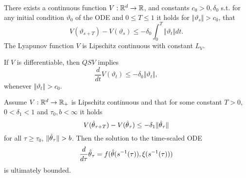 
There exists a continuous function \(V:\mathbb{R}^d\to\mathbb{R}\), and constants
\(c_0>0,\delta_0\) s.t. for any initial condition \(\vartheta_0\) of the ODE 
and \(0\leq T\leq 1\) it holds for \(\Vert \vartheta_s\Vert>c_0\), that 
\[V(\vartheta_{s+T})-V(\vartheta_s)\leq -\delta_0\int_0^T\Vert  \vartheta_t\Vert dt.\]
The Lyapunov function \(V\) is Lipschitz continuous with constant \(L_V\).  


If \(V\) is differentiable, then \(QSV\) implies 
\[\frac{d}{dt}V(\vartheta_t)\leq -\delta_0\Vert \vartheta_t\Vert,\]
whenever \(\Vert \vartheta_t\Vert >c_0\).
\begin{lemma}\label{lem:43}
    Assume \(V:\mathbb{R}^d\to\mathbb{R}_+\) is Lipschitz continuous and that for some constant \(T>0\),
    \(0<\delta_1<1\) and \(\tau_0,b<\infty\) it holds 
    \[V({\hat{\theta}}_{\tau+T})-V({\hat{\theta}}_\tau)\leq -\delta_1\Vert {\hat{\theta}}_\tau\Vert\]
    for all \(\tau\geq \tau_0\), \(\Vert{\hat{\theta}}_\tau\Vert>b\). Then the solution 
    to the time-scaled ODE 
    \begin{align*}\label{eq:ts-ode}
        \frac{d}{d\tau} {\hat{\theta}}_\tau = f({\hat{\theta}}(s^{-1}(\tau)),\xi(s^{-1}(\tau)))
    \end{align*}
    is ultimately bounded. 
\end{lemma}

